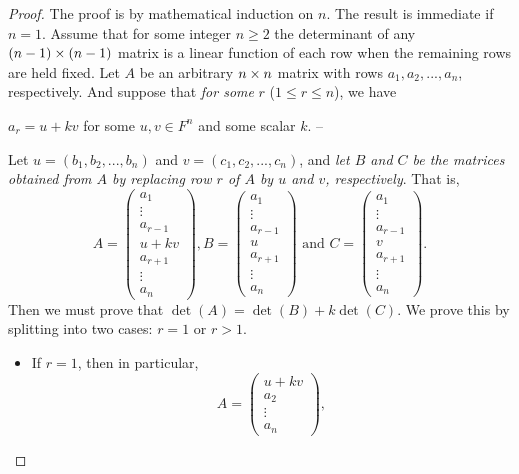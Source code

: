 \begin{proof}
The proof is by mathematical induction on \(n\).
The result is immediate if \(n = 1\).
Assume that for some integer \(n \ge 2\) the determinant of any \((n - 1) \times (n - 1)\) matrix is a linear function of each row when the remaining rows are held fixed.
Let \(A\) be an arbitrary \(n \times n\) matrix with rows \(a_1, a_2, ..., a_n\), respectively.
And suppose that \emph{for some} \(r\) (\(1 \le r \le n\)), we have
\begin{center}
    \(a_r = u + kv\) for some \(u, v \in F^n\) and some scalar \(k\). -- 
\end{center}
Let \(u = (b_1, b_2, ..., b_n)\) and \(v = (c_1, c_2, ..., c_n)\), and \emph{let \(B\) and \(C\) be the matrices obtained from \(A\) by replacing row \(r\) of \(A\) by \(u\) and \(v\), respectively}.
That is,
\[
    A = \begin{pmatrix} a_1 \\ \vdots \\ a_{r-1} \\ u + kv \\ a_{r+1} \\ \vdots \\ a_n \end{pmatrix},
    B = \begin{pmatrix} a_1 \\ \vdots \\ a_{r-1} \\ u \\ a_{r+1} \\ \vdots \\ a_n \end{pmatrix}
    \text{ and }
    C = \begin{pmatrix} a_1 \\ \vdots \\ a_{r-1} \\ v \\ a_{r+1} \\ \vdots \\ a_n \end{pmatrix}.
\]
Then we must prove that \(\det(A) = \det(B) + k\det(C)\).
We prove this by splitting into two cases: \(r = 1\) or \(r > 1\).
\begin{itemize}
\item 
If \(r = 1\), then in particular,
\[
    A = \begin{pmatrix} u + kv \\ a_2 \\ \vdots \\ a_n \end{pmatrix},
\]
\end{itemize}
\end{proof}
